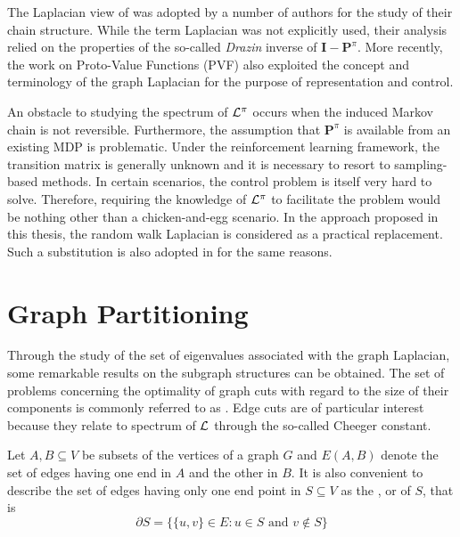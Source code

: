 The Laplacian view of \mdps was adopted by a number of authors \parencite{Lamond1989,
Puterman1994, Filar2007} for the study of their chain structure. While the term 
Laplacian was not explicitly used, their analysis relied on the
properties of the so-called \textit{Drazin} inverse \parencite{Drazin1958} of $\mathbf{I} -
\mathbf{P}^\pi$. More recently, the work on Proto-Value Functions (PVF) \parencite{Mahadevan2009}
also exploited the concept and terminology of the graph Laplacian for the purpose of representation
and control.

An obstacle to studying the spectrum of $\mathbf{\mathcal{L}}^\pi$ occurs when the induced Markov chain is not
reversible. Furthermore, the assumption that $\mathbf{P}^\pi$ is available from an
existing MDP is problematic. Under the reinforcement learning framework, the transition
matrix is generally unknown and it is necessary to resort to sampling-based methods. In
certain scenarios, the control problem is itself very hard to solve. Therefore, requiring
the knowledge of $\mathbf{\mathcal{L}}^\pi$ to facilitate the problem would be nothing other than a
chicken-and-egg scenario. In the approach proposed in this thesis, the random walk
Laplacian is considered as a practical replacement. Such a substitution
is also adopted in \cite{Mahadevan2009} for the same reasons.

\section{Graph Partitioning}
\label{sec:graph-partitioning}
Through the study of the set of eigenvalues associated with the graph Laplacian, some remarkable results on the subgraph structures can be obtained. The set of problems concerning the optimality of graph cuts with regard to the size of their components is commonly referred to as . Edge cuts are of particular interest because they relate to spectrum of $\mathbf{\mathcal{L}}$ through the so-called Cheeger constant. 

Let $A, B \subseteq V$ be subsets of the vertices of a graph $G$ and $E(A, B)$ denote the set of edges having one end in $A$ and the other in $B$. It is also convenient to describe the set of edges having only one end point in $S \subseteq V$ as the  \parencite{Chung1994},  \parencite{Chung1997} or  \parencite{Mohar91} of $S$, that is
\begin{equation}
\partial S = \{ \{u, v\} \in E : u \in S \text{ and } v \not \in S \}
\end{equation}

